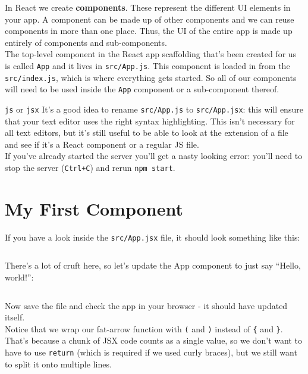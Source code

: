In React we create \textbf{components}. These represent the different UI elements in your app. A component can be made up of other components and we can reuse components in more than one place. Thus, the UI of the entire app is made up entirely of components and sub-components.
\\

The top-level component in the React app scaffolding that's been created for us is called \texttt{App} and it lives in \texttt{src/App.js}. This component is loaded in from the \texttt{src/index.js}, which is where everything gets started. So all of our components will need to be used inside the \texttt{App} component or a sub-component thereof.
\\

\begin{infobox}{\texttt{js} or \texttt{jsx}}
    It's a good idea to rename \texttt{src/App.js} to \texttt{src/App.jsx}: this will ensure that your text editor uses the right syntax highlighting. This isn't necessary for all text editors, but it's still useful to be able to look at the extension of a file and see if it's a React component or a regular JS file.
    \\

    If you've already started the server you'll get a nasty looking error: you'll need to stop the server (\texttt{Ctrl+C}) and rerun \texttt{npm start}.
\end{infobox}


\pagebreak


\section{My First Component}

If you have a look inside the \texttt{src/App.jsx} file, it should look something like this:

\inputminted{jsx}{01/figures/02/01-App.jsx}

There's a lot of cruft here, so let's update the App component to just say ``Hello, world!'':

\inputminted{jsx}{01/figures/02/02-App-redux.jsx}

Now save the file and check the app in your browser - it should have updated itself.
\\

Notice that we wrap our fat-arrow function with \texttt{(} and \texttt{)} instead of \texttt{\{} and \texttt{\}}. That's because a chunk of JSX code counts as a single value, so we don't want to have to use \texttt{return} (which is required if we used curly braces), but we still want to split it onto multiple lines.
\\

